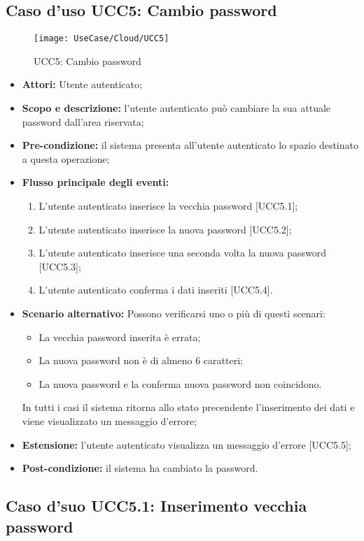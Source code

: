 \subsection{Caso d'uso UCC5: Cambio password}

\begin{figure}[H]
\centering
\texttt{[image: UseCase/Cloud/UCC5]}
\caption{UCC5: Cambio password}
\end{figure}

\begin{itemize}
\item \textbf{Attori:} Utente autenticato;
\item \textbf{Scopo e descrizione:} l'utente autenticato può cambiare la sua attuale password dall'area riservata;
\item \textbf{Pre-condizione:} il sistema presenta all'utente autenticato lo spazio destinato a questa operazione;
\item \textbf{Flusso principale degli eventi:}
\begin{enumerate}
\item L'utente autenticato inserisce la vecchia password [UCC5.1];
\item L'utente autenticato inserisce la nuova password [UCC5.2];
\item L'utente autenticato inserisce una seconda volta la nuova password [UCC5.3];
\item L'utente autenticato conferma i dati inseriti [UCC5.4].
\end{enumerate}
\item \textbf{Scenario alternativo:} Possono verificarsi uno o più di questi scenari:
\begin{itemize}
\item La vecchia password inserita è errata;
\item La nuova password non è di almeno 6 caratteri;
\item La nuova password e la conferma nuova password non coincidono.
\end{itemize}
In tutti i casi il sistema ritorna allo stato precendente l'inserimento dei dati e viene visualizzato un messaggio d'errore;
\item \textbf{Estensione:} l'utente autenticato visualizza un messaggio d'errore [UCC5.5];
\item \textbf{Post-condizione:} il sistema ha cambiato la password.
\end{itemize}

\subsection{Caso d'suo UCC5.1: Inserimento vecchia password}

